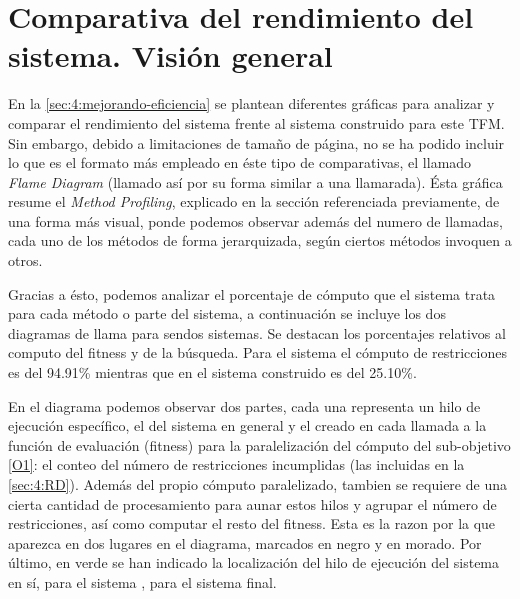 \section{Comparativa del rendimiento del sistema. Visión general} \label{Anexo:D}

En la \autoref{sec:4:mejorando-eficiencia} se plantean diferentes gráficas para analizar y comparar el rendimiento del sistema \legacy{} frente al sistema construido para este TFM. Sin embargo, debido a limitaciones de tamaño de página, no se ha podido incluir lo que es el formato más empleado en éste tipo de comparativas, el llamado \textit{Flame Diagram} (llamado así por su forma similar a una llamarada). Ésta gráfica resume el \textit{Method Profiling}, explicado en la sección referenciada previamente, de una forma más visual, ponde podemos observar además del numero de llamadas, cada uno de los métodos de forma jerarquizada, según ciertos métodos invoquen a otros.

Gracias a ésto, podemos analizar el porcentaje de cómputo que el sistema trata para cada método o parte del sistema, a continuación se incluye los dos diagramas de llama para sendos sistemas. Se destacan los porcentajes relativos al computo del fitness y de la búsqueda. Para el sistema \legacy{} el cómputo de restricciones es del 94.91\% mientras que en el sistema construido es del 25.10\%.

En el diagrama podemos observar dos partes, cada una representa un hilo de ejecución específico, el del sistema en general y el creado en cada llamada a la función de evaluación (fitness) para la paralelización del cómputo del sub-objetivo \ref{O1}: el conteo del número de restricciones incumplidas (las incluidas en la \autoref{sec:4:RD}). Además del propio cómputo paralelizado, tambien se requiere de una cierta cantidad de procesamiento para aunar estos hilos y agrupar el número de restricciones, así como computar el resto del fitness. Esta es la razon por la que aparezca en dos lugares en el diagrama, marcados en negro y en morado.
Por último, en verde se han indicado la localización del hilo de ejecución del sistema en sí, \sa{} para el sistema \legacy{}, \vns{} para el sistema final.

